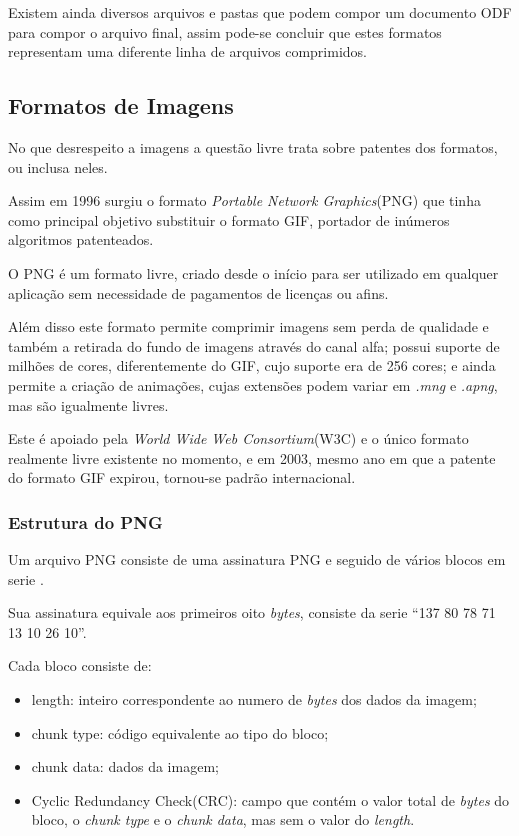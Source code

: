 Existem ainda diversos arquivos e pastas que podem compor um documento ODF para compor o arquivo final, assim pode-se concluir que estes formatos representam uma diferente linha de arquivos comprimidos.

\subsection{Formatos de Imagens}

No que desrespeito a imagens a questão livre trata sobre patentes dos formatos, ou inclusa neles.

Assim em 1996 surgiu o formato \textit{Portable Network Graphics}(PNG) que tinha como principal objetivo substituir o formato GIF, portador de inúmeros algoritmos patenteados.

O PNG é um formato livre, criado desde o início para ser utilizado em qualquer aplicação sem necessidade de pagamentos de licenças ou afins.

Além disso este formato permite comprimir imagens sem perda de qualidade e também a retirada do fundo de imagens através do canal alfa; possui suporte de milhões de cores, diferentemente do GIF, cujo suporte era de 256 cores; e ainda permite a criação de animações, cujas extensões podem variar em \textit{.mng} e \textit{.apng}, mas são igualmente livres.

Este é apoiado pela \textit{World Wide Web Consortium}(W3C) e o único formato realmente livre existente no momento, e em 2003, mesmo ano em que a patente do formato GIF expirou, tornou-se padrão internacional.

\subsubsection{Estrutura do PNG}

Um arquivo PNG consiste de uma assinatura PNG e seguido de vários blocos em serie \cite{PNG-BOOK}.

Sua assinatura equivale aos primeiros oito \textit{bytes}, consiste da serie “137 80 78 71 13 10 26 10”.

Cada bloco consiste de:

\begin{itemize}
    \item{length: inteiro correspondente ao numero de \textit{bytes} dos dados da imagem;}
    \item{chunk type: código equivalente ao tipo do bloco;}
    \item{chunk data: dados da imagem;}
    \item{Cyclic Redundancy Check(CRC): campo que contém o valor total de \textit{bytes} do bloco, o \textit{chunk type} e o \textit{chunk data}, mas sem o valor do \textit{length}.}
\end{itemize}

